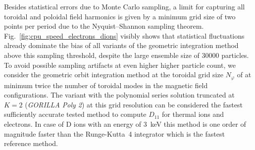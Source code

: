 \documentclass[./main.tex]{subfiles}
\begin{document}
Besides statistical errors due to Monte Carlo sampling, a limit for capturing
all toroidal and poloidal field harmonics is given by a minimum grid size of
two points per period due to the Nyquist–Shannon sampling theorem.
Fig.~\ref{fig:cpu_speed_electrons_dions}
visibly shows that statistical fluctuations already dominate the bias of all variants of the geometric
integration method above this sampling threshold, despite the large ensemble size of
30000 particles.
To avoid possible sampling artifacts at even higher higher particle count, we consider the geometric orbit integration method at the toroidal grid size $N_\varphi$ of
at minimum twice the number of toroidal modes in the magnetic field configurations.
The variant with the polynomial series solution truncated at $K=2$ (\textit{GORILLA Poly 2}) at
this grid resolution can be considered the fastest sufficiently accurate tested method to compute
$D_{11}$ for thermal ions and electrons. In case of D ions with an energy of 3~keV this method
is one order of magnitude faster than the Runge-Kutta~4 integrator which is the fastest
reference method.




\newpage
\end{document}
